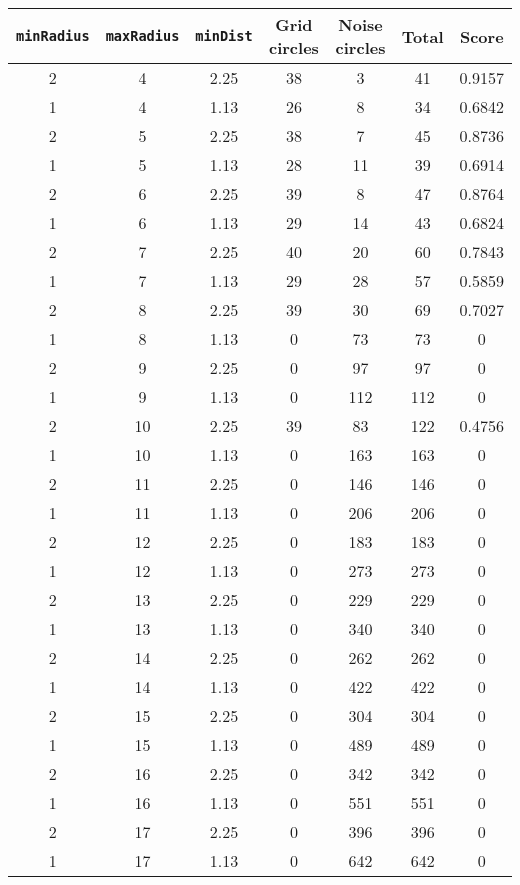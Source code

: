 \documentclass[letterpaper, 12pt]{article}
\begin{document}
\begin{longtable}{|c|c|c|c|c|c|c|}
\hline
\textbf{\texttt{minRadius}} & \textbf{\texttt{maxRadius}} & \textbf{\texttt{minDist}} & \textbf{Grid circles} & \textbf{Noise circles} & \textbf{Total} & \textbf{Score} \\
\hline
2 & 4 & 2.25 & 38 & 3 & 41 & 0.9157 \\
\hline
1 & 4 & 1.13 & 26 & 8 & 34 & 0.6842 \\
\hline
2 & 5 & 2.25 & 38 & 7 & 45 & 0.8736 \\
\hline
1 & 5 & 1.13 & 28 & 11 & 39 & 0.6914 \\
\hline
2 & 6 & 2.25 & 39 & 8 & 47 & 0.8764 \\
\hline
1 & 6 & 1.13 & 29 & 14 & 43 & 0.6824 \\
\hline
2 & 7 & 2.25 & 40 & 20 & 60 & 0.7843 \\
\hline
1 & 7 & 1.13 & 29 & 28 & 57 & 0.5859 \\
\hline
2 & 8 & 2.25 & 39 & 30 & 69 & 0.7027 \\
\hline
1 & 8 & 1.13 & 0 & 73 & 73 & 0 \\
\hline
2 & 9 & 2.25 & 0 & 97 & 97 & 0 \\
\hline
1 & 9 & 1.13 & 0 & 112 & 112 & 0 \\
\hline
2 & 10 & 2.25 & 39 & 83 & 122 & 0.4756 \\
\hline
1 & 10 & 1.13 & 0 & 163 & 163 & 0 \\
\hline
2 & 11 & 2.25 & 0 & 146 & 146 & 0 \\
\hline
1 & 11 & 1.13 & 0 & 206 & 206 & 0 \\
\hline
2 & 12 & 2.25 & 0 & 183 & 183 & 0 \\
\hline
1 & 12 & 1.13 & 0 & 273 & 273 & 0 \\
\hline
2 & 13 & 2.25 & 0 & 229 & 229 & 0 \\
\hline
1 & 13 & 1.13 & 0 & 340 & 340 & 0 \\
\hline
2 & 14 & 2.25 & 0 & 262 & 262 & 0 \\
\hline
1 & 14 & 1.13 & 0 & 422 & 422 & 0 \\
\hline
2 & 15 & 2.25 & 0 & 304 & 304 & 0 \\
\hline
1 & 15 & 1.13 & 0 & 489 & 489 & 0 \\
\hline
2 & 16 & 2.25 & 0 & 342 & 342 & 0 \\
\hline
1 & 16 & 1.13 & 0 & 551 & 551 & 0 \\
\hline
2 & 17 & 2.25 & 0 & 396 & 396 & 0 \\
\hline
1 & 17 & 1.13 & 0 & 642 & 642 & 0 \\

\end{longtable}
\end{document}
